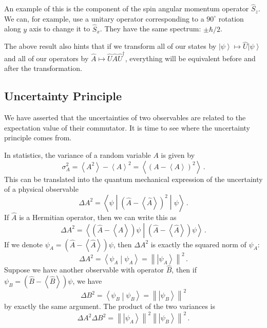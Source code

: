 \documentclass{article}
\theoremstyle{plain}\theoremheaderfont{\normalfont\itshape}\theorembodyfont{\rmfamily}\theoremseparator{.}\newtheorem*{rem}{Remark}\newtheorem*{ex}{Example}\newtheorem*{proof}{Proof}\newtheorem*{altp}{Alternative proof}
\theoremstyle{plain}\theoremheaderfont{\normalfont\bfseries}\theorembodyfont{\rmfamily}\theoremseparator{.}\newtheorem{thm}{Theorem}[section]\newtheorem{lem}[thm]{Lemma}\newtheorem{prop}[thm]{Proposition}\newtheorem*{cor}{Corollary}\newtheorem{defn}[thm]{Definition}\newtheorem{clm}[thm]{Claim}\newtheorem{clminproof}{Claim}
\theoremstyle{break}\theoremheaderfont{\normalfont\itshape}\theorembodyfont{\rmfamily}\theoremseparator{.\medskip}\newtheorem*{proofskip}{Proof}\newtheorem*{exs}{Examples}\newtheorem*{rems}{Remarks}
\theoremstyle{break}\theoremheaderfont{\normalfont\bfseries}\theorembodyfont{\rmfamily}\theoremseparator{.\medskip}\newtheorem{lemskip}[thm]{Lemma}\newtheorem{defnskip}[thm]{Definition}\newtheorem{propskip}[thm]{Proposition}\newtheorem{thmskip}[thm]{Theorem}
\numberwithin{equation}{section}
\newcommand{\ket}[1]{\left| #1 \right\rangle}
\newcommand{\braket}[2]{\left\langle #1 \middle| #2 \right\rangle}
\newcommand{\eval}[1]{\left\langle #1 \right\rangle}
\newcommand{\expval}[2]{\left\langle #2 \middle| #1 \middle| #2 \right\rangle}
\newcommand{\norm}[1]{\left\| #1 \right\|}
\begin{document}
    An example of this is the component of the spin angular momentum operator \(\hat{S}_z\). We can, for example, use a unitary operator corresponding to a \(90^\circ\) rotation along \(y\) axis to change it to \(\hat{S}_x\). They have the same spectrum: \(\pm\hbar/2\).

    The above result also hints that if we transform all of our states by \(\ket{\psi}\mapsto\hat{U}\ket{\psi}\) and all of our operators by \(\hat{A}\mapsto\hat{U}\hat{A}\hat{U}^\dagger\), everything will be equivalent before and after the transformation.

    \subsection{Uncertainty Principle}
    We have asserted that the uncertainties of two observables are related to the expectation value of their commutator. It is time to see where the uncertainty principle comes from.

    In statistics, the variance of a random variable \(A\) is given by
    \begin{equation}
        \sigma_A^2=\eval{A^2}-\eval{A}^2=\eval{(A-\eval{A})^2}\,.
    \end{equation}
    This can be translated into the quantum mechanical expression of the uncertainty of a physical observable
    \begin{equation}
        \Delta A^2=\expval{\left(\hat{A}-\eval{\hat{A}}\right)^2}{\psi}\,.
    \end{equation}
    If \(\hat{A}\) is a Hermitian operator, then we can write this as
    \begin{equation}
        \Delta A^2=\braket{\left(\hat{A}-\eval{\hat{A}}\right)\psi}{\left(\hat{A}-\eval{\hat{A}}\right)\psi}\,.
    \end{equation}
    If we denote \(\psi_A=\left(\hat{A}-\eval{\hat{A}}\right)\psi\), then \(\Delta A^2\) is exactly the squared norm of \(\psi_A\):
    \begin{equation}
        \Delta A^2=\braket{\psi_A}{\psi_A}=\norm{\ket{\psi_A}}^2\,.
    \end{equation}
    Suppose we have another observable with operator \(\hat{B}\), then if \(\psi_B=\left(\hat{B}-\eval{\hat{B}}\right)\psi\), we have
    \begin{equation}
        \Delta B^2=\braket{\psi_B}{\psi_B}=\norm{\ket{\psi_B}}^2
    \end{equation}
    by exactly the same argument. The product of the two variances is
    \begin{equation}
        \Delta A^2\Delta B^2=\norm{\ket{\psi_A}}^2\norm{\ket{\psi_B}}^2\,.
    \end{equation}
\end{document}
